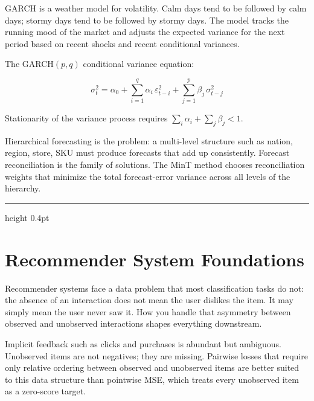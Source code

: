 \documentclass[12pt,a4paper]{article}
\begin{document}
\begin{analogy}
GARCH is a weather model for volatility. Calm days tend to be followed by
calm days; stormy days tend to be followed by stormy days. The model tracks
the running mood of the market and adjusts the expected variance for the
next period based on recent shocks and recent conditional variances.
\end{analogy}

The GARCH$(p,q)$ conditional variance equation:

\begin{equation*}
  \sigma_t^2
  = \alpha_0
  + \sum_{i=1}^{q} \alpha_i\,\varepsilon_{t-i}^2
  + \sum_{j=1}^{p} \beta_j\,\sigma_{t-j}^2
\end{equation*}

Stationarity of the variance process requires
$\sum_{i}\alpha_i + \sum_{j}\beta_j < 1$.

\begin{mentalmodel}
Hierarchical forecasting is the problem: a multi-level structure such as
nation, region, store, SKU must produce forecasts that add up consistently.
Forecast reconciliation is the family of solutions. The MinT method
chooses reconciliation weights that minimize the total forecast-error
variance across all levels of the hierarchy.
\end{mentalmodel}

\vspace{10pt}\hrule height 0.4pt\vspace{14pt}

\section*{Recommender System Foundations}

Recommender systems face a data problem that most classification tasks
do not: the absence of an interaction does not mean the user dislikes the
item. It may simply mean the user never saw it. How you handle that
asymmetry between observed and unobserved interactions shapes everything
downstream.

\begin{concept}
Implicit feedback such as clicks and purchases is abundant but ambiguous.
Unobserved items are not negatives; they are missing. Pairwise losses
that require only relative ordering between observed and unobserved items
are better suited to this data structure than pointwise MSE, which treats
every unobserved item as a zero-score target.
\end{concept}
\end{document}
